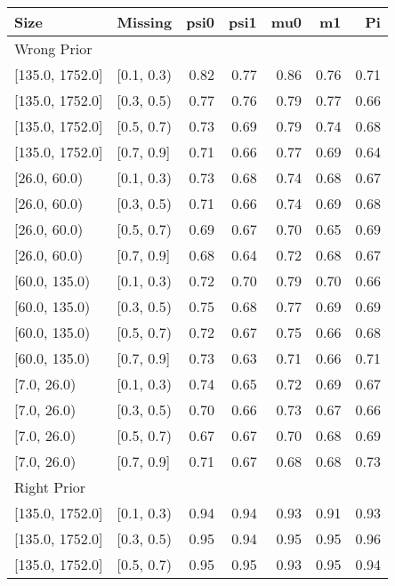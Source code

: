 \begin{table}[ht]
\centering
\begin{tabular}{llrrrrr}
  \toprule
Size & Missing & psi0 & psi1 & mu0 & m1 & Pi \\ 
  \midrule
\multicolumn{7}{l}{Wrong Prior}\\
{[135.0, 1752.0]} & {[0.1, 0.3)} & 0.82 & 0.77 & 0.86 & 0.76 & 0.71 \\ 
  {[135.0, 1752.0]} & {[0.3, 0.5)} & 0.77 & 0.76 & 0.79 & 0.77 & 0.66 \\ 
  {[135.0, 1752.0]} & {[0.5, 0.7)} & 0.73 & 0.69 & 0.79 & 0.74 & 0.68 \\ 
  {[135.0, 1752.0]} & {[0.7, 0.9]} & 0.71 & 0.66 & 0.77 & 0.69 & 0.64 \\ 
  {[26.0, 60.0)} & {[0.1, 0.3)} & 0.73 & 0.68 & 0.74 & 0.68 & 0.67 \\ 
  {[26.0, 60.0)} & {[0.3, 0.5)} & 0.71 & 0.66 & 0.74 & 0.69 & 0.68 \\ 
  {[26.0, 60.0)} & {[0.5, 0.7)} & 0.69 & 0.67 & 0.70 & 0.65 & 0.69 \\ 
  {[26.0, 60.0)} & {[0.7, 0.9]} & 0.68 & 0.64 & 0.72 & 0.68 & 0.67 \\ 
  {[60.0, 135.0)} & {[0.1, 0.3)} & 0.72 & 0.70 & 0.79 & 0.70 & 0.66 \\ 
  {[60.0, 135.0)} & {[0.3, 0.5)} & 0.75 & 0.68 & 0.77 & 0.69 & 0.69 \\ 
  {[60.0, 135.0)} & {[0.5, 0.7)} & 0.72 & 0.67 & 0.75 & 0.66 & 0.68 \\ 
  {[60.0, 135.0)} & {[0.7, 0.9]} & 0.73 & 0.63 & 0.71 & 0.66 & 0.71 \\ 
  {[7.0, 26.0)} & {[0.1, 0.3)} & 0.74 & 0.65 & 0.72 & 0.69 & 0.67 \\ 
  {[7.0, 26.0)} & {[0.3, 0.5)} & 0.70 & 0.66 & 0.73 & 0.67 & 0.66 \\ 
  {[7.0, 26.0)} & {[0.5, 0.7)} & 0.67 & 0.67 & 0.70 & 0.68 & 0.69 \\ 
  {[7.0, 26.0)} & {[0.7, 0.9]} & 0.71 & 0.67 & 0.68 & 0.68 & 0.73 \\ 
   \midrule
\multicolumn{7}{l}{Right Prior}\\
{[135.0, 1752.0]} & {[0.1, 0.3)} & 0.94 & 0.94 & 0.93 & 0.91 & 0.93 \\ 
  {[135.0, 1752.0]} & {[0.3, 0.5)} & 0.95 & 0.94 & 0.95 & 0.95 & 0.96 \\ 
  {[135.0, 1752.0]} & {[0.5, 0.7)} & 0.95 & 0.95 & 0.93 & 0.95 & 0.94 \\ 

\end{tabular}
\end{table}

